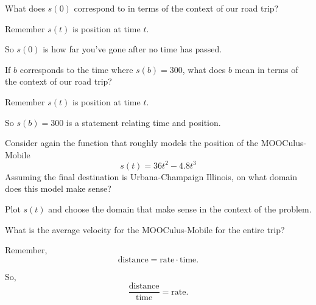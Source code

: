 \documentclass{ximera}
\begin{document}
\begin{question} %
What does $s(0)$ correspond to in terms of the context of our road
trip?
\begin{hint}
Remember $s(t)$ is position at time $t$.
\end{hint}
\begin{hint}
So $s(0)$ is how far you've gone after no time has passed. 
\end{hint}
\begin{multipleChoice}
\end{multipleChoice}
\end{question}

\begin{question} %
If $b$ corresponds to the time where $s(b) = 300$, what does $b$ mean
in terms of the context of our road trip?
\begin{hint}
Remember $s(t)$ is position at time $t$.
\end{hint}
\begin{hint}
So $s(b)=300$ is a statement relating time and position.  
\end{hint}
\begin{multipleChoice}
\end{multipleChoice}
\end{question}


\begin{question} %
Consider again the function that roughly models the position of the
MOOCulus-Mobile
\[
s(t) = 36t^2 -4.8t^3
\]
Assuming the final destination is Urbana-Champaign Illinois, on what
domain does this model make sense?
\begin{hint}
  Plot $s(t)$ and choose the domain that make sense in the context of
  the problem.
\end{hint}
\end{question}

\begin{question}
  What is the average velocity for the MOOCulus-Mobile for the entire trip? 
\begin{hint}
Remember, 
\[
\text{distance} = \text{rate}\cdot\text{time}.
\]
\end{hint}
\begin{hint}
So, 
\[
\frac{\text{distance}}{\text{time}} = \text{rate}.
\]
\end{hint}
\end{question}
\end{document}
